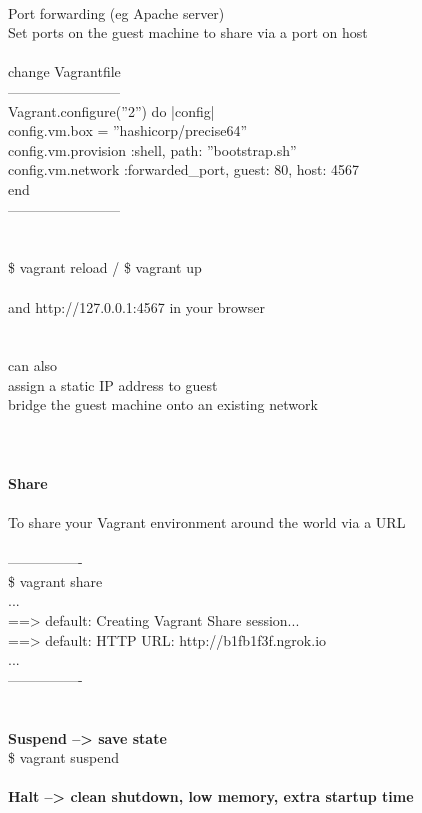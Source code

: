 \documentclass[10pt,a4paper]{article}
\begin{document}
{{{{{{{{{{{{{{{{{{{{{{{{\\
Port forwarding (eg Apache server)\\
Set ports on the guest machine to share via a port on host\\
\\
change Vagrantfile\\
------------------------\\
Vagrant.configure(''2'') do |config|\\
  config.vm.box = ''hashicorp/precise64''\\
  config.vm.provision :shell, path: ''bootstrap.sh''\\
  config.vm.network :forwarded\_port, guest: 80, host: 4567\\
end\\
------------------------\\
\\
\\
\$ vagrant reload  /  \$ vagrant up\\
\\
and http://127.0.0.1:4567 in your browser\\
\\
\\
can also \\
assign a static IP address to guest \\
bridge the guest machine onto an existing network\\
\\
\\
\\
\textbf{Share}\\
\\
To share your Vagrant environment around the world via a URL\\
\\
----------------\\
\$ vagrant share\\
...\\
==> default: Creating Vagrant Share session...\\
==> default: HTTP URL: http://b1fb1f3f.ngrok.io\\
...\\
----------------\\
\\
\\
\textbf{Suspend --> save state\\
}\$ vagrant suspend\textbf{\\
\\
Halt --> clean shutdown, low memory, extra startup time\\
}}}}}}}}}}}}}}}}}}}}}}}}}
\end{document}
